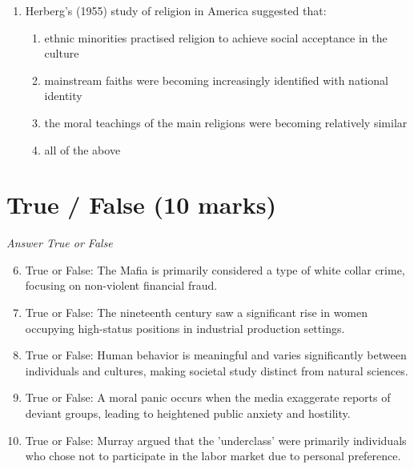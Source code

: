 \documentclass[12pt]{article}
\begin{document}
\begin{enumerate}[label=\arabic*.]
\begin{enumerate}[label=(\alph*)]
    \item schools prepare children for work by teaching them to be obedient
    \item teachers and parents tend to have similar attitudes to learning
    \item children who write lots of letters develop a better grasp of language
    \item boys' and girls' educational achievements have recently become similar
\end{enumerate}
\item Herberg's (1955) study of religion in America suggested that:
\begin{enumerate}[label=(\alph*)]
    \item ethnic minorities practised religion to achieve social acceptance in the culture
    \item mainstream faiths were becoming increasingly identified with national identity
    \item the moral teachings of the main religions were becoming relatively similar
    \item all of the above
\end{enumerate}
\end{enumerate}

\section*{True / False (10 marks)}
\textit{Answer True or False}
\begin{enumerate}[label=\arabic*.]
\setcounter{enumi}{5}
\item True or False: The Mafia is primarily considered a type of white collar crime, focusing on non-violent financial fraud.
\item True or False: The nineteenth century saw a significant rise in women occupying high-status positions in industrial production settings.
\item True or False: Human behavior is meaningful and varies significantly between individuals and cultures, making societal study distinct from natural sciences.
\item True or False: A moral panic occurs when the media exaggerate reports of deviant groups, leading to heightened public anxiety and hostility.
\item True or False: Murray argued that the 'underclass' were primarily individuals who chose not to participate in the labor market due to personal preference.
\end{enumerate}
\end{document}
